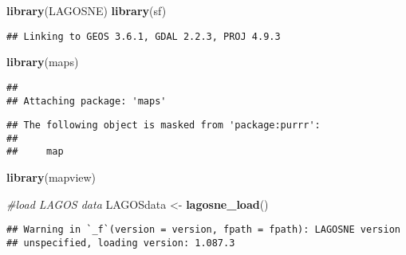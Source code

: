\documentclass[]{article}
\newenvironment{Shaded}{\begin{snugshade}}{\end{snugshade}}
\newcommand{\CommentTok}[1]{\textcolor[rgb]{0.56,0.35,0.01}{\textit{#1}}}
\newcommand{\KeywordTok}[1]{\textcolor[rgb]{0.13,0.29,0.53}{\textbf{#1}}}
\newcommand{\NormalTok}[1]{#1}
\newcommand{\OperatorTok}[1]{\textcolor[rgb]{0.81,0.36,0.00}{\textbf{#1}}}
\newcommand{\StringTok}[1]{\textcolor[rgb]{0.31,0.60,0.02}{#1}}
\begin{document}
\begin{Shaded}
\begin{Highlighting}[]
\KeywordTok{library}\NormalTok{(LAGOSNE)}
\KeywordTok{library}\NormalTok{(sf)}
\end{Highlighting}
\end{Shaded}

\begin{verbatim}
## Linking to GEOS 3.6.1, GDAL 2.2.3, PROJ 4.9.3
\end{verbatim}

\begin{Shaded}
\begin{Highlighting}[]
\KeywordTok{library}\NormalTok{(maps)}
\end{Highlighting}
\end{Shaded}

\begin{verbatim}
## 
## Attaching package: 'maps'
\end{verbatim}

\begin{verbatim}
## The following object is masked from 'package:purrr':
## 
##     map
\end{verbatim}

\begin{Shaded}
\begin{Highlighting}[]
\KeywordTok{library}\NormalTok{(mapview)}

\CommentTok{#load LAGOS data}
\NormalTok{LAGOSdata <-}\StringTok{ }\KeywordTok{lagosne_load}\NormalTok{()}
\end{Highlighting}
\end{Shaded}

\begin{verbatim}
## Warning in `_f`(version = version, fpath = fpath): LAGOSNE version
## unspecified, loading version: 1.087.3
\end{verbatim}

\begin{Shaded}
\end{Shaded}
\end{document}
